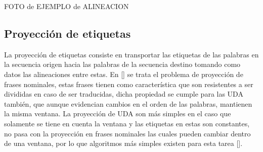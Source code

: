 FOTO de EJEMPLO de ALINEACION

\subsection{Proyección de etiquetas}

La proyección de etiquetas consiste en transportar las etiquetas de las palabras en la secuencia origen
hacia las palabras de la secuencia destino tomando como datos las alineaciones entre estas. En [\cite{yarowsky2001inducing}]
se trata el problema de proyección de frases nominales, estas frases tienen como característica que son resistentes
a ser divididas en caso de ser traducidas, dicha propiedad se cumple para las UDA también, que aunque evidencian 
cambios en el orden de las palabras, mantienen la misma ventana. La proyección de UDA son más simples en el caso
que solamente se tiene en cuenta la ventana y las etiquetas en estas son constantes, no pasa con la proyección en
frases nominales las cuales pueden cambiar dentro de una ventana, por lo que algoritmos más simples existen
para esta tarea [\cite{eger2018cross}].
